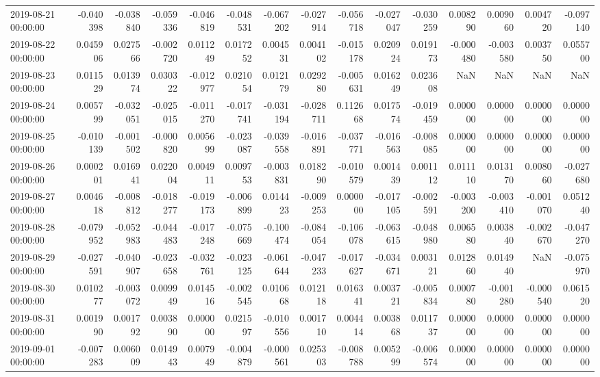 \begin{tabular}{lrrrrrrrrrrrrrr}
2019-08-21 00:00:00 & -0.040398 & -0.038840 & -0.059336 & -0.046819 & -0.048531 & -0.067202 & -0.027914 & -0.056718 & -0.027047 & -0.030259 & 0.008290 & 0.009060 & 0.004720 & -0.097140 \\
2019-08-22 00:00:00 & 0.045906 & 0.027566 & -0.002720 & 0.011249 & 0.017252 & 0.004531 & 0.004102 & -0.015178 & 0.020924 & 0.019173 & -0.000480 & -0.003580 & 0.003750 & 0.055700 \\
2019-08-23 00:00:00 & 0.011529 & 0.013974 & 0.030322 & -0.012977 & 0.021054 & 0.012179 & 0.029280 & -0.005631 & 0.016249 & 0.023608 & NaN & NaN & NaN & NaN \\
2019-08-24 00:00:00 & 0.005799 & -0.032051 & -0.025015 & -0.011270 & -0.017741 & -0.031194 & -0.028711 & 0.112668 & 0.017574 & -0.019459 & 0.000000 & 0.000000 & 0.000000 & 0.000000 \\
2019-08-25 00:00:00 & -0.010139 & -0.001502 & -0.000820 & 0.005699 & -0.023087 & -0.039558 & -0.016891 & -0.037771 & -0.016563 & -0.008085 & 0.000000 & 0.000000 & 0.000000 & 0.000000 \\
2019-08-26 00:00:00 & 0.000201 & 0.016941 & 0.022004 & 0.004911 & 0.009753 & -0.003831 & 0.018290 & -0.010579 & 0.001439 & 0.001112 & 0.011110 & 0.013170 & 0.008060 & -0.027680 \\
2019-08-27 00:00:00 & 0.004618 & -0.008812 & -0.018277 & -0.019173 & -0.006899 & 0.014423 & -0.009253 & 0.000000 & -0.017105 & -0.002591 & -0.003200 & -0.003410 & -0.001070 & 0.051240 \\
2019-08-28 00:00:00 & -0.079952 & -0.052983 & -0.044483 & -0.017248 & -0.075669 & -0.100474 & -0.084054 & -0.106078 & -0.063615 & -0.048980 & 0.006580 & 0.003840 & -0.002670 & -0.047270 \\
2019-08-29 00:00:00 & -0.027591 & -0.040907 & -0.023658 & -0.032761 & -0.023125 & -0.061644 & -0.047233 & -0.017627 & -0.034671 & 0.003121 & 0.012860 & 0.014940 & NaN & -0.075970 \\
2019-08-30 00:00:00 & 0.010277 & -0.003072 & 0.009949 & 0.014516 & -0.002545 & 0.010668 & 0.012118 & 0.016341 & 0.003721 & -0.005834 & 0.000780 & -0.001280 & -0.000540 & 0.061520 \\
2019-08-31 00:00:00 & 0.001990 & 0.001792 & 0.003890 & 0.000000 & 0.021597 & -0.010556 & 0.001710 & 0.004414 & 0.003868 & 0.011737 & 0.000000 & 0.000000 & 0.000000 & 0.000000 \\
2019-09-01 00:00:00 & -0.007283 & 0.006009 & 0.014943 & 0.007949 & -0.004879 & -0.000561 & 0.025303 & -0.008788 & 0.005299 & -0.006574 & 0.000000 & 0.000000 & 0.000000 & 0.000000 \\

\end{tabular}
